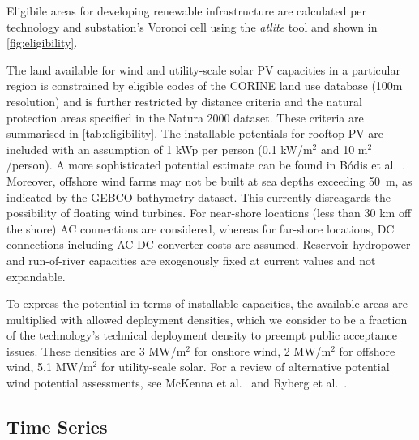 Eligibile areas for developing renewable infrastructure are calculated per
technology and substation's Voronoi cell using the
\textit{atlite} tool and shown in
\cref{fig:eligibility}.

The land available for wind and utility-scale solar PV capacities in a
particular region is constrained by eligible codes of the
CORINE land use database (100m
resolution)  and is further restricted by distance criteria and the natural
protection areas specified in the Natura
2000 dataset. These criteria are
summarised in \cref{tab:eligibility}. The installable potentials for rooftop PV
are included with an assumption of 1 kWp per person (0.1 kW/m$^2$ and 10
m$^2$/person). A more sophisticated potential estimate can be found in Bódis et
al.~. Moreover, offshore wind farms may
not be built at sea depths exceeding \SI{50}{\metre}, as indicated by the GEBCO
bathymetry dataset. This currently disreagards the
possibility of floating wind turbines.
For near-shore locations (less than 30 km off the shore) AC connections are
considered, whereas for far-shore locations, DC connections including AC-DC
converter costs are assumed. Reservoir hydropower and run-of-river capacities
are exogenously fixed at current values and not expandable.

To express the potential in terms of installable capacities, the available areas
are multiplied with allowed deployment densities, which we consider to be a
fraction of the technology's technical deployment density to preempt public
acceptance issues. These densities are 3 MW/m$^ 2$ for onshore wind, 2 MW/m$^2$
for offshore wind, 5.1 MW/m$^2$ for utility-scale solar. For a review of
alternative potential wind potential assessments, see McKenna et
al.~ and Ryberg et
al.~.


\subsection{Time Series}
\label{sec:si:renewable-ts}

